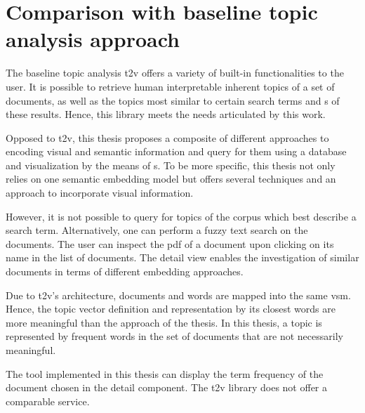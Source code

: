 \section{Comparison with baseline topic analysis approach}\label{sec:evaluation-top-model-app}

The baseline topic analysis \ac{t2v} offers a variety of built-in functionalities to the user.
It is possible to retrieve human interpretable inherent topics of a set of documents, 
as well as the topics most similar to certain search terms 
and \wordcloud{}s of these results.
Hence, this library meets the needs articulated by this work.

Opposed to \ac{t2v}, this thesis proposes a composite of different approaches to encoding visual and semantic information 
and query for them using a database and visualization by the means of \wordcloud{}s.
To be more specific, this thesis not only relies on one semantic embedding model but offers several techniques and an approach to incorporate visual information.

However, it is not possible to query for topics of the corpus which best describe a search term.
Alternatively, one can perform a fuzzy text search on the documents.
The user can inspect the \ac{pdf} of a document upon clicking on its name in the list of documents.
The detail view enables the investigation of similar documents in terms of different embedding approaches.

Due to \ac{t2v}'s architecture, documents and words are mapped into the same \ac{vsm}.
Hence, the topic vector definition and representation by its closest words are more meaningful than the approach of the thesis. 
In this thesis, a topic is represented by frequent words in the set of documents that are not necessarily meaningful. 

The tool implemented in this thesis can display the term frequency of the document chosen in the detail component.
The \ac{t2v} library does not offer a comparable service.